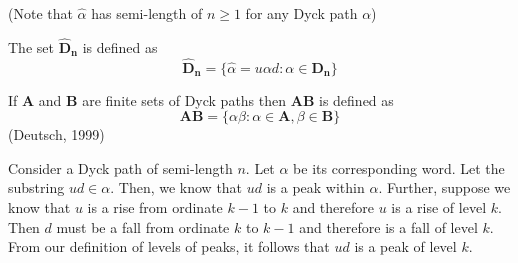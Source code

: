 \documentclass[12pt]{article}
\theoremstyle{definition}
\numberwithin{equation}{section}
\newcommand{\set}[1]{\{#1\}}
\begin{document}
(Note that $\hat{\alpha}$ has semi-length of $n\geq 1$ for any Dyck path $\alpha$)

The set $\mathbf{\hat{D}_n}$ is defined as 
\begin{equation}
    \mathbf{\hat{D}_n} = \set{\hat{\alpha} = u\alpha d : \alpha\in \mathbf{D_n}}
\end{equation}

If $\mathbf{A}$ and $\mathbf{B}$ are finite sets of Dyck paths then $\mathbf{AB}$ is defined as 
\begin{equation}
    \mathbf{AB} = \set{\alpha\beta : \alpha\in \mathbf{A}, \beta\in\mathbf{B}}
\end{equation} (Deutsch, 1999)

\example Consider a Dyck path of semi-length $n$. Let $\alpha$ be its corresponding word. Let the substring $ud\in \alpha$. Then, we know that $ud$ is a peak within $\alpha$. Further, suppose we know that $u$ is a rise from ordinate $k-1$ to $k$ and therefore $u$ is a rise of level $k$. Then $d$ must be a fall from ordinate $k$ to $k-1$ and therefore is a fall of level $k$. From our definition of levels of peaks, it follows that $ud$ is a peak of level $k$. 
\end{document}
